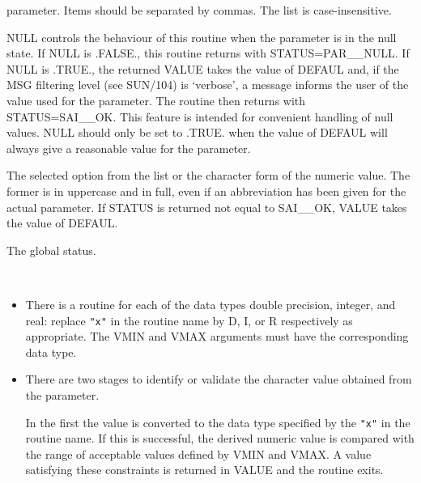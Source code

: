 \documentclass[twoside,11pt]{article}
\newcommand{\xref}[3]{#1}
\newcommand{\latex}[1]{#1}
\newcommand{\sstsubsection}[1]{ \item[{#1}] \mbox{} \\}
\newcommand{\sstnotes}[1]{\item[Notes:] \mbox{} \\[1.3ex] #1}
\newcommand{\sstitemlist}[1]{
  \mbox{} \\
  \vspace{-7ex}
  \begin{itemize}
     #1
  \end{itemize}
}
\newcommand{\sstitem}{\item}
\renewcommand{\sstsubsection}[1]{\item[{#1}]}
\renewcommand{\sstnotes}[1]{\item[Notes:]
      \begin{description}
         #1
      \end{description}
   }
\newcommand{\sstitemlist}[1]{
      \begin{itemize}
         #1
      \end{itemize}
   }
\begin{document}
{{{         parameter.  Items should be separated by commas.  The list is
         case-insensitive.
      }
      \sstsubsection{
         NULL = LOGICAL (Given)
      }{
         NULL controls the behaviour of this routine when the parameter
         is in the null state.  If NULL is .FALSE., this routine
         returns with STATUS=PAR\_\_NULL.  If NULL is .TRUE., the
         returned VALUE takes the value of DEFAUL and, if the
\xref{MSG filtering level}{sun104}{conditional_message_reporting}
\latex{ (see SUN/104)} is `verbose',
         a message informs the user of the value used for
         the parameter. The routine then returns with STATUS=SAI\_\_OK. 
         This feature is intended for convenient handling of null values.
         NULL should only be set to .TRUE. when the value of DEFAUL will
         always give a reasonable value for the parameter.
      }
      \sstsubsection{
         VALUE = CHARACTER $*$ ( $*$ ) (Returned)
      }{
         The selected option from the list or the character form of the
         numeric value.  The former is in uppercase and in full, even
         if an abbreviation has been given for the actual parameter.
         If STATUS is returned not equal to SAI\_\_OK, VALUE takes the
         value of DEFAUL.
      }
      \sstsubsection{
         STATUS = INTEGER (Given and Returned)
      }{
         The global status.
      }
   }
   \sstnotes{
      \sstitemlist{

         \sstitem
         There is a routine for each of the data types double precision,
         integer, and real: replace {\tt "x"} in the routine name by D, I, or R
         respectively as appropriate.  The VMIN and VMAX arguments must
         have the corresponding data type.

         \sstitem
         There are two stages to identify or validate the character
         value obtained from the parameter.

      In the first the value is converted to the data type specified by
      the {\tt "x"} in the routine name.  If this is successful, the derived
      numeric value is compared with the range of acceptable values
      defined by VMIN and VMAX.  A value satisfying these constraints
      is returned in VALUE and the routine exits.

}}}
\end{document}

